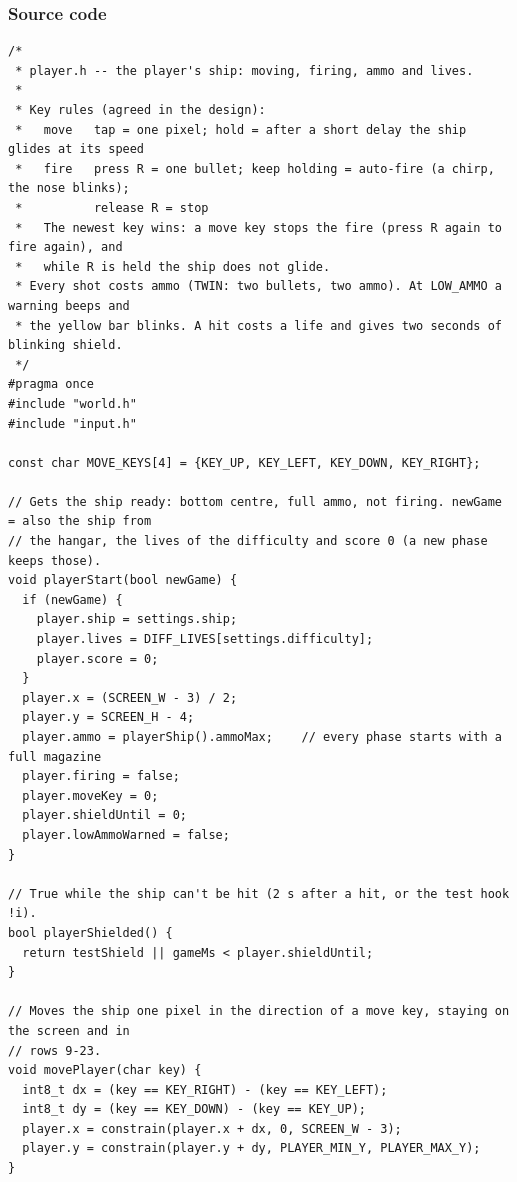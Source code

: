 \documentclass[11pt,a4paper]{article}
\begin{document}
\subsubsection*{Source code}
\begin{lstlisting}[language=Arduino]
/*
 * player.h -- the player's ship: moving, firing, ammo and lives.
 *
 * Key rules (agreed in the design):
 *   move   tap = one pixel; hold = after a short delay the ship glides at its speed
 *   fire   press R = one bullet; keep holding = auto-fire (a chirp, the nose blinks);
 *          release R = stop
 *   The newest key wins: a move key stops the fire (press R again to fire again), and
 *   while R is held the ship does not glide.
 * Every shot costs ammo (TWIN: two bullets, two ammo). At LOW_AMMO a warning beeps and
 * the yellow bar blinks. A hit costs a life and gives two seconds of blinking shield.
 */
#pragma once
#include "world.h"
#include "input.h"

const char MOVE_KEYS[4] = {KEY_UP, KEY_LEFT, KEY_DOWN, KEY_RIGHT};

// Gets the ship ready: bottom centre, full ammo, not firing. newGame = also the ship from
// the hangar, the lives of the difficulty and score 0 (a new phase keeps those).
void playerStart(bool newGame) {
  if (newGame) {
    player.ship = settings.ship;
    player.lives = DIFF_LIVES[settings.difficulty];
    player.score = 0;
  }
  player.x = (SCREEN_W - 3) / 2;
  player.y = SCREEN_H - 4;
  player.ammo = playerShip().ammoMax;    // every phase starts with a full magazine
  player.firing = false;
  player.moveKey = 0;
  player.shieldUntil = 0;
  player.lowAmmoWarned = false;
}

// True while the ship can't be hit (2 s after a hit, or the test hook !i).
bool playerShielded() {
  return testShield || gameMs < player.shieldUntil;
}

// Moves the ship one pixel in the direction of a move key, staying on the screen and in
// rows 9-23.
void movePlayer(char key) {
  int8_t dx = (key == KEY_RIGHT) - (key == KEY_LEFT);
  int8_t dy = (key == KEY_DOWN) - (key == KEY_UP);
  player.x = constrain(player.x + dx, 0, SCREEN_W - 3);
  player.y = constrain(player.y + dy, PLAYER_MIN_Y, PLAYER_MAX_Y);
}


\end{lstlisting}
\end{document}
